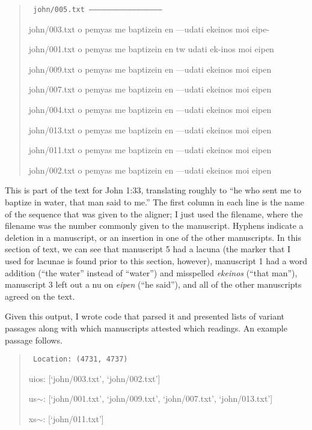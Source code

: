 \documentclass[onecolumn, 12pt]{article}
\begin{document}
\begin{quotation}
{\tt
john/005.txt        ---------------------------------------------------

john/003.txt        o pemyas me baptizein en ---udati ekeinos moi eipe-

john/001.txt        o pemyas me baptizein en tw udati ek-inos moi eipen

john/009.txt        o pemyas me baptizein en ---udati ekeinos moi eipen

john/007.txt        o pemyas me baptizein en ---udati ekeinos moi eipen

john/004.txt        o pemyas me baptizein en ---udati ekeinos moi eipen

john/013.txt        o pemyas me baptizein en ---udati ekeinos moi eipen

john/011.txt        o pemyas me baptizein en ---udati ekeinos moi eipen

john/002.txt        o pemyas me baptizein en ---udati ekeinos moi eipen
}
\end{quotation}

This is part of the text for John 1:33, translating roughly to ``he who sent me
to baptize in water, that man said to me.''  The first column in each line is
the name of the sequence that was given to the aligner; I just used the
filename, where the filename was the number commonly given to the manuscript.
Hyphens indicate a deletion in a manuscript, or an insertion in one of the
other manuscripts.  In this section of text, we can see that manuscript 5 had a
lacuna (the marker that I used for lacunae is found prior to this section,
however), manuscript 1 had a word addition (``the water'' instead of ``water'')
and misspelled \emph{ekeinos} (``that man''), manuscript 3 left out a nu on
\emph{eipen} (``he said''), and all of the other manuscripts agreed on the
text.

Given this output, I wrote code that parsed it and presented lists of variant
passages along with which manuscripts attested which readings.  An example
passage follows.

\begin{quotation}
{\tt
Location: (4731, 4737)

uios: [`john/003.txt', `john/002.txt'] 

us$\sim$: [`john/001.txt', `john/009.txt', `john/007.txt', `john/013.txt'] 

xs$\sim$: [`john/011.txt'] 
}
\end{quotation}
\end{document}
